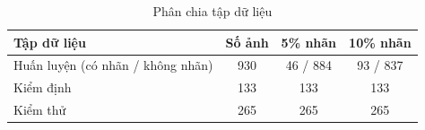 \begin{table}[!t]
\caption{Phân chia tập dữ liệu}
\label{tab:split}
\centering
\setlength{\tabcolsep}{3pt}
\begin{tabular}{|p{100pt}|c|c|c|}
\hline
Tập dữ liệu & Số ảnh & 5\% nhãn & 10\% nhãn \\
\hline
Huấn luyện (có nhãn / không nhãn) & 930 & 46 / 884 & 93 / 837 \\
Kiểm định & 133 & 133 & 133 \\
Kiểm thử & 265 & 265 & 265 \\
\hline
\end{tabular}
\end{table}
